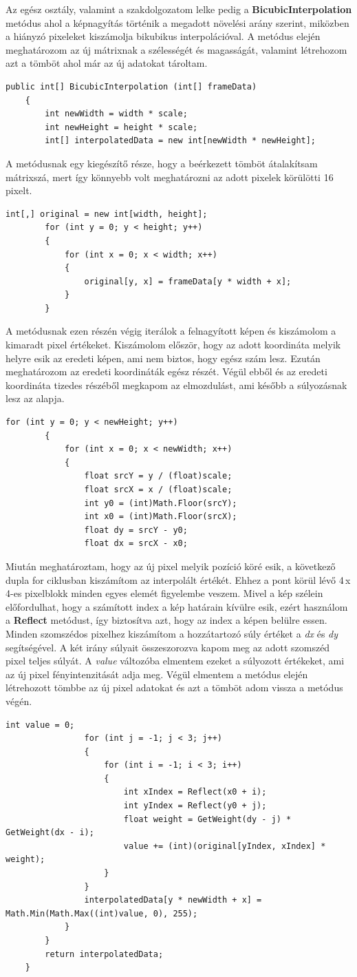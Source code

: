 \documentclass[]{thesis-ekf}
\theoremstyle{definition}
\theoremstyle{remark}
\begin{document}
Az egész osztály, valamint a szakdolgozatom lelke pedig a \textbf{BicubicInterpolation} metódus ahol a képnagyítás történik a megadott növelési arány szerint, miközben a hiányzó pixeleket kiszámolja bikubikus interpolációval. A metódus elején meghatározom az új mátrixnak a szélességét és magasságát, valamint létrehozom azt a tömböt ahol már az új adatokat tároltam.
\begin{lstlisting}[language=CSharp]
	public int[] BicubicInterpolation (int[] frameData)
	{
		int newWidth = width * scale;
		int newHeight = height * scale;
		int[] interpolatedData = new int[newWidth * newHeight];
\end{lstlisting}
A metódusnak egy kiegészítő része, hogy a beérkezett tömböt átalakítsam mátrixszá, mert így könnyebb volt meghatározni az adott pixelek körülötti 16 pixelt. 
\begin{lstlisting}[language=CSharp]
		int[,] original = new int[width, height];
		for (int y = 0; y < height; y++)
		{
			for (int x = 0; x < width; x++)
			{
				original[y, x] = frameData[y * width + x];
			}
		}
\end{lstlisting}
A metódusnak ezen részén végig iterálok a felnagyított képen és kiszámolom a kimaradt pixel értékeket. Kiszámolom először, hogy az adott koordináta melyik helyre esik az eredeti képen, ami nem biztos, hogy egész szám lesz. Ezután meghatározom az eredeti koordináták egész részét. Végül ebből és az eredeti koordináta tizedes részéből megkapom az elmozdulást, ami később a súlyozásnak lesz az alapja. 
\begin{lstlisting}[language=CSharp]
		for (int y = 0; y < newHeight; y++)
		{
			for (int x = 0; x < newWidth; x++)
			{
				float srcY = y / (float)scale;
				float srcX = x / (float)scale;
				int y0 = (int)Math.Floor(srcY);
				int x0 = (int)Math.Floor(srcX);
				float dy = srcY - y0;
				float dx = srcX - x0;
\end{lstlisting}
Miután meghatároztam, hogy az új pixel melyik pozíció köré esik, a következő dupla for ciklusban kiszámítom az interpolált értékét. Ehhez a pont körül lévő 4\,x\,4-es pixelblokk minden egyes elemét figyelembe veszem. Mivel a kép szélein előfordulhat, hogy a számított index a kép határain kívülre esik, ezért használom a \textbf{Reflect} metódust, így biztosítva azt, hogy az index a képen belülre essen. Minden szomszédos pixelhez kiszámítom a hozzátartozó súly értéket a \emph{dx} és \emph{dy} segítségével. A két irány súlyait összeszorozva kapom meg az adott szomszéd pixel teljes súlyát. A \emph{value} változóba elmentem ezeket a súlyozott értékeket, ami az új pixel fényintenzitását adja meg. Végül elmentem a metódus elején létrehozott tömbbe az új pixel adatokat és azt a tömböt adom vissza a metódus végén.
\begin{lstlisting}[language=CSharp]
				int value = 0;
				for (int j = -1; j < 3; j++)
				{
					for (int i = -1; i < 3; i++)
					{
						int xIndex = Reflect(x0 + i);
						int yIndex = Reflect(y0 + j);
						float weight = GetWeight(dy - j) * GetWeight(dx - i);
						value += (int)(original[yIndex, xIndex] * weight);
					}
				}
				interpolatedData[y * newWidth + x] = Math.Min(Math.Max((int)value, 0), 255);
			}
		}
		return interpolatedData;
	}
	
	
\end{lstlisting}
\end{document}
